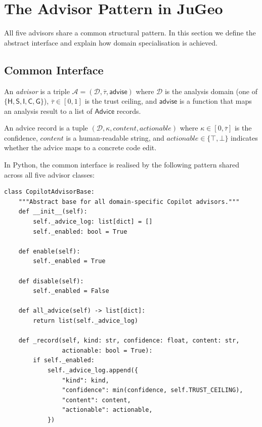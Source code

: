 \documentclass[11pt]{article}
\newcommand{\Adv}{\mathcal{A}}
\newcommand{\Domain}{\mathcal{D}}
\newcommand{\Trust}{\tau}
\newcommand{\TrustCeil}{\overline{\Trust}}
\newcommand{\Conf}{\kappa}
\newcommand{\Advice}{\mathsf{Advice}}
\newcommand{\AdvisorOp}{\mathsf{advise}}
\newcommand{\DomainSet}{\{\mathsf{H},\mathsf{S},\mathsf{I},\mathsf{C},\mathsf{G}\}}
\begin{document}
\section{The Advisor Pattern in JuGeo}\label{sec:pattern}

All five advisors share a common structural pattern.  In this section
we define the abstract interface and explain how domain specialisation
is achieved.

\subsection{Common Interface}\label{sec:common-interface}

An \emph{advisor} is a triple $\Adv = (\Domain, \TrustCeil, \AdvisorOp)$
where $\Domain$ is the analysis domain (one of $\DomainSet$),
$\TrustCeil \in [0,1]$ is the trust ceiling, and $\AdvisorOp$ is a
function that maps an analysis result to a list of $\Advice$ records.

\begin{definition}\label{def:advice}
An advice record is a tuple $(\Domain, \Conf, \mathit{content},
\mathit{actionable})$ where $\Conf \in [0,\TrustCeil]$ is the
confidence, $\mathit{content}$ is a human-readable string, and
$\mathit{actionable} \in \{\top, \bot\}$ indicates whether the
advice maps to a concrete code edit.
\end{definition}

In Python, the common interface is realised by the following pattern
shared across all five advisor classes:

\begin{lstlisting}[style=jugeo-python, caption={Common advisor pattern (schematic).}, label={lst:common}]
class CopilotAdvisorBase:
    """Abstract base for all domain-specific Copilot advisors."""
    def __init__(self):
        self._advice_log: list[dict] = []
        self._enabled: bool = True

    def enable(self):
        self._enabled = True

    def disable(self):
        self._enabled = False

    def all_advice(self) -> list[dict]:
        return list(self._advice_log)

    def _record(self, kind: str, confidence: float, content: str,
                actionable: bool = True):
        if self._enabled:
            self._advice_log.append({
                "kind": kind,
                "confidence": min(confidence, self.TRUST_CEILING),
                "content": content,
                "actionable": actionable,
            })
\end{lstlisting}
\end{document}
